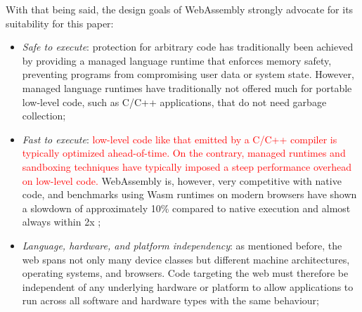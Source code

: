 With that being said, the design goals of WebAssembly strongly advocate for its suitability for this paper:

\begin{itemize}
    \item \emph{Safe to execute}: protection for arbitrary code has traditionally been achieved by providing a managed language runtime that enforces memory safety, preventing programs from compromising user data or system state. However, managed language runtimes have traditionally not offered much for portable low-level code, such as C/C++ applications, that do not need garbage collection;
    \item \emph{Fast to execute}: \textcolor{red}{low-level code like that emitted by a C/C++ compiler is typically optimized ahead-of-time. On the contrary, managed runtimes and sandboxing techniques have typically imposed a steep performance overhead on low-level code.} WebAssembly is, however, very competitive with native code, and benchmarks using Wasm runtimes on modern browsers have shown a slowdown of approximately 10\% compared to native execution and almost always within 2x \cite{haas2017bringing};
    \item \emph{Language, hardware, and platform independency}: as mentioned before, the web spans not only many device classes but different machine architectures, operating systems, and browsers. Code targeting the web must therefore be independent of any underlying hardware or platform to allow applications to run across all software and hardware types with the same behaviour;

\end{itemize}

